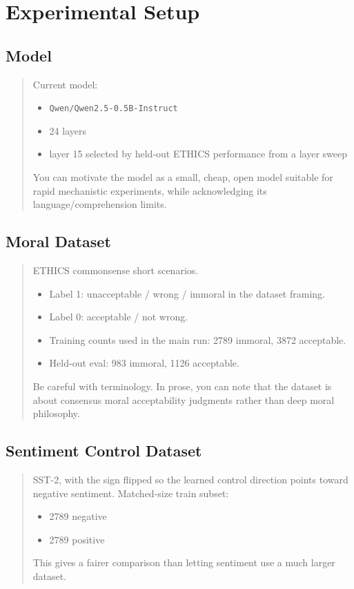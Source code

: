 \documentclass[11pt]{article}
\newcommand{\draftnote}[1]{%
  \begin{quote}\footnotesize\color{gray}#1\end{quote}%
}
\begin{document}
\section{Experimental Setup}
\subsection{Model}
\draftnote{
Current model:
\begin{itemize}[leftmargin=1.5em]
    \item \texttt{Qwen/Qwen2.5-0.5B-Instruct}
    \item 24 layers
    \item layer 15 selected by held-out ETHICS performance from a layer sweep
\end{itemize}
You can motivate the model as a small, cheap, open model suitable for rapid mechanistic experiments, while acknowledging its language/comprehension limits.
}

\subsection{Moral Dataset}
\draftnote{
ETHICS commonsense short scenarios.
\begin{itemize}[leftmargin=1.5em]
    \item Label 1: unacceptable / wrong / immoral in the dataset framing.
    \item Label 0: acceptable / not wrong.
    \item Training counts used in the main run: 2789 immoral, 3872 acceptable.
    \item Held-out eval: 983 immoral, 1126 acceptable.
\end{itemize}
Be careful with terminology. In prose, you can note that the dataset is about consensus moral acceptability judgments rather than deep moral philosophy.
}

\subsection{Sentiment Control Dataset}
\draftnote{
SST-2, with the sign flipped so the learned control direction points toward negative sentiment.
Matched-size train subset:
\begin{itemize}[leftmargin=1.5em]
    \item 2789 negative
    \item 2789 positive
\end{itemize}
This gives a fairer comparison than letting sentiment use a much larger dataset.
}
\end{document}

